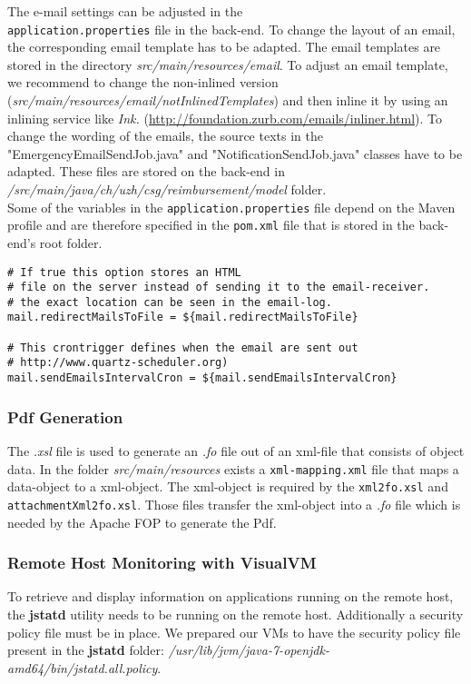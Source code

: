 The e-mail settings can be adjusted in the \\ \texttt{application.properties} file in the back-end. To change the layout of an email, the corresponding email template has to be adapted. The email templates are stored in the directory \textit{src/main/resources/email}. To adjust an email template, we recommend to change the non-inlined version (\textit{src/main/resources/email/notInlinedTemplates}) and then inline it by using an inlining service like \textit{Ink.} (\url{http://foundation.zurb.com/emails/inliner.html}). To change the wording of the emails, the source texts in the "EmergencyEmailSendJob.java" and "NotificationSendJob.java" classes have to be adapted. These files are stored on the back-end in \textit{/src/main/java/ch/uzh/csg/reimbursement/model} folder. \newline \\
Some of the variables in the \texttt{application.properties} file depend on the Maven profile and are therefore specified in the \texttt{pom.xml} file that is stored in the back-end's root folder.

\begin{lstlisting}
# If true this option stores an HTML
# file on the server instead of sending it to the email-receiver.
# the exact location can be seen in the email-log.
mail.redirectMailsToFile = ${mail.redirectMailsToFile}

# This crontrigger defines when the email are sent out
# http://www.quartz-scheduler.org)
mail.sendEmailsIntervalCron = ${mail.sendEmailsIntervalCron}
\end{lstlisting}

\subsubsection{Pdf Generation}
\label{subsubsec:pdf-xml-mappings}

The \textit{.xsl} file is used to generate an \textit{.fo} file out of an xml-file that consists of object data. In the folder \textit{src/main/resources} exists a \texttt{xml-mapping.xml} file that maps a data-object to a xml-object. The xml-object is required by the \texttt{xml2fo.xsl} and \texttt{attachmentXml2fo.xsl}. Those files transfer the xml-object into a \textit{.fo} file which is needed by the Apache FOP to generate the Pdf.


\subsubsection{Remote Host Monitoring with VisualVM}
\label{appendix:visualvm}
To retrieve and display information on applications running on the remote host, the \textbf{jstatd} utility needs to be running on the remote host. Additionally a security policy file must be in place. We prepared our VMs to have the security policy file present in the \textbf{jstatd} folder:  \textit{/usr/lib/jvm/java-7-openjdk-amd64/bin/jstatd.all.policy}.\par

